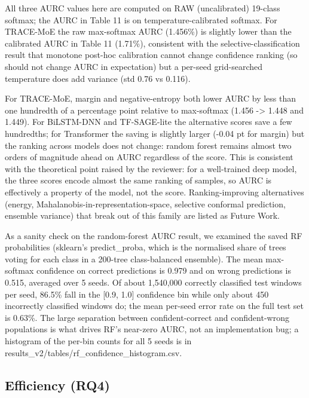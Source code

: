 \documentclass[11pt]{article}
\begin{document}
All three AURC values here are computed on RAW (uncalibrated) 19-class softmax; the AURC in Table 11 is on temperature-calibrated softmax. For TRACE-MoE the raw max-softmax AURC (1.456\%) is slightly lower than the calibrated AURC in Table 11 (1.71\%), consistent with the selective-classification result that monotone post-hoc calibration cannot change confidence ranking (so should not change AURC in expectation) but a per-seed grid-searched temperature does add variance (std 0.76 vs 0.116).

For TRACE-MoE, margin and negative-entropy both lower AURC by less than one hundredth of a percentage point relative to max-softmax (1.456 -> 1.448 and 1.449). For BiLSTM-DNN and TF-SAGE-lite the alternative scores save a few hundredths; for Transformer the saving is slightly larger (-0.04 pt for margin) but the ranking across models does not change: random forest remains almost two orders of magnitude ahead on AURC regardless of the score. This is consistent with the theoretical point raised by the reviewer: for a well-trained deep model, the three scores encode almost the same ranking of samples, so AURC is effectively a property of the model, not the score. Ranking-improving alternatives (energy, Mahalanobis-in-representation-space, selective conformal prediction, ensemble variance) that break out of this family are listed as Future Work.

As a sanity check on the random-forest AURC result, we examined the saved RF probabilities (sklearn's predict\_proba, which is the normalised share of trees voting for each class in a 200-tree class-balanced ensemble). The mean max-softmax confidence on correct predictions is 0.979 and on wrong predictions is 0.515, averaged over 5 seeds. Of about 1,540,000 correctly classified test windows per seed, 86.5\% fall in the [0.9, 1.0] confidence bin while only about 450 incorrectly classified windows do; the mean per-seed error rate on the full test set is 0.63\%. The large separation between confident-correct and confident-wrong populations is what drives RF's near-zero AURC, not an implementation bug; a histogram of the per-bin counts for all 5 seeds is in results\_v2/tables/rf\_confidence\_histogram.csv.

\subsection{Efficiency (RQ4)}
\begin{table}[htbp]
\centering

\caption{Model size and inference latency (single-thread CPU; RTX 3050 Laptop GPU for CUDA).}
\label{tab:13}
\end{table}
\end{document}
